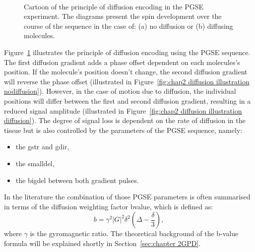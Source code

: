 \begin{figure}[phtb]
\centering
{}\\
\caption{Cartoon of the principle of diffusion encoding in the PGSE experiment. The diagrams present the spin development over the course of the sequence in the case of: (a) no diffusion or (b) diffusing molecules.}
\label{fig:chap2 diffusion illustration}
\end{figure}


Figure~\ref{fig:chap2 diffusion illustration} illustrates the principle of diffusion encoding using the PGSE sequence. The first diffusion gradient adds a phase offset dependent on each molecules's position. If the molecule's position doesn't change, the second diffusion gradient will reverse the phase offset (illustrated in Figure~\ref{fig:chap2 diffusion illustration nodiffusion}). However, in the case of motion due to diffusion, the individual positions will differ between the first and second diffusion gradient, resulting in a reduced signal amplitude	(illustrated in Figure~\ref{fig:chap2 diffusion illustration diffusion}). The degree of signal loss is dependent on the rate of diffusion in the tissue but is also controlled by the parameters of the {\gls{PGSE}} sequence, namely:

\begin{itemize}
	\item the {\gls{gstr}} and {\gls{gdir}},
	\item the {\gls{smalldel}},
	\item the {\gls{bigdel}} between both gradient pulses.
\end{itemize}

In the literature the combination of those PGSE parameters is often summarised in terms of the diffusion weighting factor {\gls{bvalue}}\citep{LeBihan:1986}, which is defined as:
\begin{equation}
	b = \gamma^2|G|^2\delta^2(\Delta-\frac{\delta}{3}),
    \label{eq:bvalue}
\end{equation}
where $\gamma$ is the gyromagnetic ratio. The theoretical background of the b-value formula will be explained shortly in Section~\ref{sec:chapter 2GPD}.

